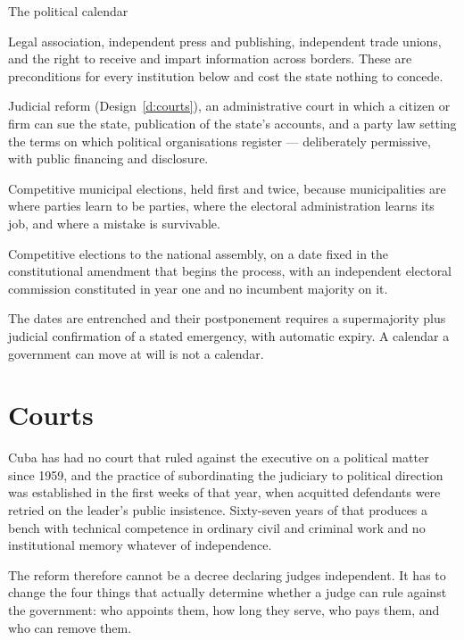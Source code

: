 \begin{design}{The political calendar}
\label{d:calendar}
\begin{rules}
 Legal association, independent press and publishing,
independent trade unions, and the right to receive and impart information
across borders. These are preconditions for every institution below and cost
the state nothing to concede.

 Judicial reform (Design~\ref{d:courts}), an administrative
court in which a citizen or firm can sue the state, publication of the state's
accounts, and a party law setting the terms on which political organisations
register --- deliberately permissive, with public financing and disclosure.

 Competitive municipal elections, held first and
twice, because municipalities are where parties learn to be parties, where the
electoral administration learns its job, and where a mistake is survivable.

 Competitive elections to the national assembly, on a date
fixed in the constitutional amendment that begins the process, with an
independent electoral commission constituted in year one and no incumbent
majority on it.

 The dates are entrenched and their postponement
requires a supermajority plus judicial confirmation of a stated emergency,
with automatic expiry. A calendar a government can move at will is not a
calendar.
\end{rules}
\end{design}

\section{Courts}

Cuba has had no court that ruled against the executive on a political matter
since 1959, and the practice of subordinating the judiciary to political
direction was established in the first weeks of that year, when acquitted
defendants were retried on the leader's public insistence. Sixty-seven years of
that produces a bench with technical competence in ordinary civil and criminal
work and no institutional memory whatever of independence.

The reform therefore cannot be a decree declaring judges independent. It has to
change the four things that actually determine whether a judge can rule against
the government: who appoints them, how long they serve, who pays them, and who
can remove them.

